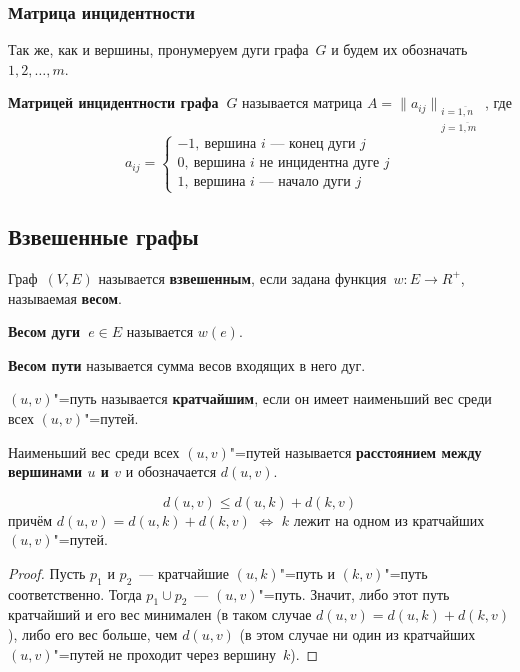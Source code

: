 \subsubsection{Матрица инцидентности}
Так же, как и вершины, пронумеруем дуги графа~$G$ и будем их обозначать $1, 2, \ldots, m$.

 \textbf{Матрицей инцидентности графа~$G$} называется матрица $A = \|a_{ij}\|_{\begin{smallmatrix}
i = \overline{1,n} \\
j = \overline{1,m}
\end{smallmatrix}}$, где
\begin{equation*}
a_{ij} =
\begin{cases}
-1, \ \text{вершина~$i$~--- конец дуги~$j$} \\
0, \ \text{вершина~$i$ не инцидентна дуге~$j$} \\
1, \ \text{вершина~$i$~--- начало дуги~$j$}
\end{cases}
\end{equation*}

\subsection{Взвешенные графы}
Граф~$(V, E)$ называется \textbf{взвешенным}, если задана функция~$w \colon E \to R^+$, называемая \textbf{весом}.

\textbf{Весом дуги~$e \in E$} называется $w(e)$.

\textbf{Весом пути} называется сумма весов входящих в него дуг.

$(u, v)$"=путь называется \textbf{кратчайшим}, если он имеет наименьший вес среди всех $(u, v)$"=путей.

Наименьший вес среди всех $(u, v)$"=путей называется \textbf{расстоянием между вершинами $u$ и $v$} и обозначается $d(u, v)$.

\begin{statement}
\begin{equation*}
d(u, v) \leqslant d(u, k) + d(k, v)
\end{equation*}
причём $d(u, v) = d(u, k) + d(k, v)$ $\Leftrightarrow$ $k$ лежит на одном из кратчайших $(u, v)$"=путей.
\end{statement}
\begin{proof}
Пусть $p_1$ и $p_2$~--- кратчайшие $(u, k)$"=путь и $(k, v)$"=путь соответственно.
Тогда $p_1 \cup p_2$~--- $(u, v)$"=путь.
Значит, либо этот путь кратчайший и его вес минимален (в таком случае $d(u, v) = d(u, k) + d(k, v)$), либо его вес больше, чем $d(u, v)$ (в этом случае ни один из кратчайших $(u, v)$"=путей не проходит через вершину~$k$).
\end{proof}


